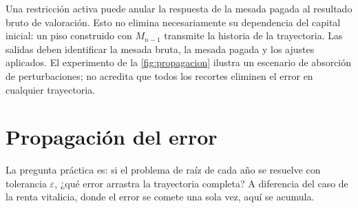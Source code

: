 \begin{criticism}
\label{crit:ajustes}
Una restricción activa puede anular la respuesta de la mesada pagada al
resultado bruto de valoración. Esto no elimina necesariamente su dependencia
del capital inicial: un piso construido con $M_{n-1}$ transmite la historia
de la trayectoria. Las salidas deben identificar la mesada bruta, la mesada
pagada y los ajustes aplicados. El experimento de la \cref{fig:propagacion}
ilustra un escenario de absorción de perturbaciones; no acredita que todos
los recortes eliminen el error en cualquier trayectoria.
\end{criticism}

\section{Propagación del error}
\label{sec:propagacion}

La pregunta práctica es: si el problema de raíz de cada año se resuelve con
tolerancia $\varepsilon$, ¿qué error arrastra la trayectoria completa? A diferencia
del caso de la renta vitalicia, donde el error se comete una sola vez, aquí se
acumula.

